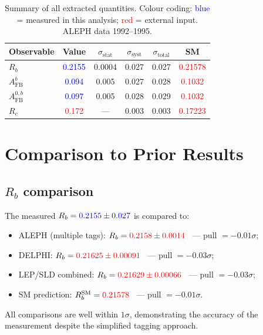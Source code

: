 \documentclass[11pt,a4paper]{article}
\newcommand{\measured}[1]{\textcolor{blue}{#1}}
\newcommand{\external}[1]{\textcolor{red}{#1}}
\begin{document}
\begin{table}[htbp]
\centering
\caption{Summary of all extracted quantities.  Colour coding:
  \measured{blue} = measured in this analysis;
  \external{red} = external input.  ALEPH data 1992--1995.}
\label{tbl:all-results}
\begin{tabular}{lccccc}
\toprule
Observable & Value & $\sigma_\mathrm{stat}$ & $\sigma_\mathrm{syst}$ & $\sigma_\mathrm{total}$ & SM \\
\midrule
$R_b$ & \measured{0.2155} & 0.0004 & 0.027 & 0.027 & \external{0.21578} \\
$A_\mathrm{FB}^b$ & \measured{0.094} & 0.005 & 0.027 & 0.028 & \external{0.1032} \\
$A_\mathrm{FB}^{0,b}$ & \measured{0.097} & 0.005 & 0.028 & 0.029 & \external{0.1032} \\
$R_c$ & \external{0.172} & --- & 0.003 & 0.003 & \external{0.17223} \\
\bottomrule
\end{tabular}
\end{table}

\section{Comparison to Prior Results}
\label{sec:comparison}

\subsection{$R_b$ comparison}

The measured $R_b = \measured{0.2155 \pm 0.027}$ is compared to:
\begin{itemize}
\item ALEPH (multiple tags): $R_b = \external{0.2158 \pm 0.0014}$~\cite{ALEPH:Rb:1996} --- pull $= -0.01\sigma$;
\item DELPHI: $R_b = \external{0.21625 \pm 0.00091}$~\cite{DELPHI:Rb} --- pull $= -0.03\sigma$;
\item LEP/SLD combined: $R_b = \external{0.21629 \pm 0.00066}$~\cite{LEP:EWWG:2005} --- pull $= -0.03\sigma$;
\item SM prediction: $R_b^\mathrm{SM} = \external{0.21578}$~\cite{LEP:EWWG:2005} --- pull $= -0.01\sigma$.
\end{itemize}

All comparisons are well within $1\sigma$, demonstrating the accuracy of
the measurement despite the simplified tagging approach.
\end{document}
